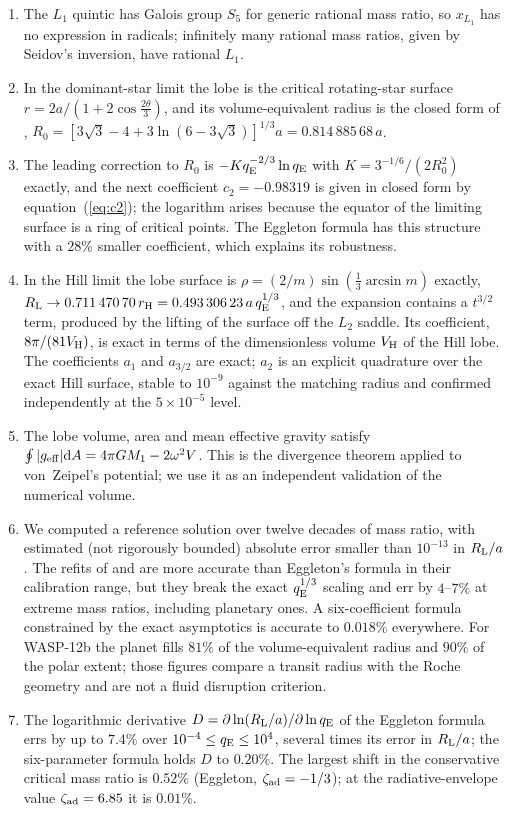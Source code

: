 \documentclass[twocolumn]{aastex702}
\newcommand{\qE}{q_{\rm E}}
\newcommand{\RL}{R_{\rm L}}
\newcommand{\dd}{\mathrm{d}}
\newcommand{\geff}{g_{\rm eff}}
\begin{document}
\begin{enumerate}
\item The $L_1$ quintic has Galois group $S_5$ for generic rational mass ratio, so $x_{L_1}$ has no expression in radicals; infinitely many rational mass ratios, given by Seidov's inversion, have rational $L_1$.
\item In the dominant-star limit the lobe is the critical rotating-star surface $r=2a/(1+2\cos\tfrac{2\theta}{3})$, and its volume-equivalent radius is the closed form of \citet{Kopal1959}, $R_0=[3\sqrt3-4+3\ln(6-3\sqrt3)]^{1/3}a=0.814\,885\,68\,a$.
\item The leading correction to $R_0$ is $-K\qE^{-2/3}\ln\qE$ with $K=3^{-1/6}/(2R_0^2)$ exactly, and the next coefficient $c_2=-0.98319$ is given in closed form by equation~(\ref{eq:c2}); the logarithm arises because the equator of the limiting surface is a ring of critical points. The Eggleton formula has this structure with a $28\%$ smaller coefficient, which explains its robustness.
\item In the Hill limit the lobe surface is $\rho=(2/m)\sin(\tfrac13\arcsin m)$ exactly, $\RL\to0.711\,470\,70\,r_{\rm H}=0.493\,306\,23\,a\,\qE^{1/3}$, and the expansion contains a $t^{3/2}$ term, produced by the lifting of the surface off the $L_2$ saddle. Its coefficient, $8\pi/(81V_{\rm H})$, is exact in terms of the dimensionless volume $V_{\rm H}$ of the Hill lobe. The coefficients $a_1$ and $a_{3/2}$ are exact; $a_2$ is an explicit quadrature over the exact Hill surface, stable to $10^{-9}$ against the matching radius and confirmed independently at the $5\times10^{-5}$ level.
\item The lobe volume, area and mean effective gravity satisfy $\oint|\geff|\dd A=4\pi GM_1-2\omega^2V$. This is the divergence theorem applied to von~Zeipel's potential; we use it as an independent validation of the numerical volume.
\item We computed a reference solution over twelve decades of mass ratio, with estimated (not rigorously bounded) absolute error smaller than $10^{-13}$ in $\RL/a$. The refits of \citet{LeahyLeahy2015} and \citet{Qi2026} are more accurate than Eggleton's formula in their calibration range, but they break the exact $\qE^{1/3}$ scaling and err by $4$--$7\%$ at extreme mass ratios, including planetary ones. A six-coefficient formula constrained by the exact asymptotics is accurate to $0.018\%$ everywhere. For WASP-12b the planet fills $81\%$ of the volume-equivalent radius and $90\%$ of the polar extent; those figures compare a transit radius with the Roche geometry and are not a fluid disruption criterion.
\item The logarithmic derivative $D=\partial\ln(\RL/a)/\partial\ln\qE$ of the Eggleton formula errs by up to $7.4\%$ over $10^{-4}\le\qE\le10^4$, several times its error in $\RL/a$; the six-parameter formula holds $D$ to $0.20\%$. The largest shift in the conservative critical mass ratio is $0.52\%$ (Eggleton, $\zeta_{\rm ad}=-1/3$); at the radiative-envelope value $\zeta_{\rm ad}=6.85$ it is $0.01\%$.
\end{enumerate}
\end{document}
